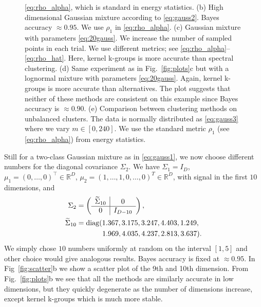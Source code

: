 \documentclass[10pt,journal,compsoc]{IEEEtran}
\DeclareMathOperator{\diag}{diag}
\begin{document}
\begin{figure}
{\eqref{eq:rho_alpha}, which is standard in energy statistics.
(b)
High dimensional Gaussian mixture according to \eqref{eq:gauss2}.
Bayes accuracy $\approx 0.95$. We use $\rho_1$ in \eqref{eq:rho_alpha}.
(c)
Gaussian mixture with parameters \eqref{eq:20gauss}. We increase
the number of sampled points in each trial. We use different
metrics; see \eqref{eq:rho_alpha}--\eqref{eq:rho_hat}. 
Here, kernel k-groups is more accurate than spectral clustering.
(d)
Same experiment as in Fig.~\ref{fig:plots}c but with a 
lognormal mixture with parameters \eqref{eq:20gauss}.
Again, kernel k-groups is more accurate than alternatives.
The plot suggests that neither of these methods are
consistent on this example since Bayes accuracy is $\approx 0.90$.
(e)
Comparison between clustering methods
on unbalanced clusters. The data is normally 
distributed as \eqref{eq:gauss3} where
we vary $m \in [0, 240]$. We use the standard metric $\rho_1$ (see
\eqref{eq:rho_alpha}) from energy statistics.
}
\end{figure}

Still for a two-class Gaussian mixture as in \eqref{eq:gauss1}, we now choose
different numbers for the  diagonal covariance $\Sigma_2$.
We have $\Sigma_1=I_D$, $\mu_1=(0,\dotsc,0)^\top \in \mathbb{R}^D$,
$\mu_2=(1,\dotsc,1,0,\dotsc,0)^T \in \mathbb{R}^D$, 
with signal in the first $10$ dimensions, and
\begin{equation}
\label{eq:gauss2}
\begin{split}
\Sigma_2 &= \left( \begin{array}{c|c}
\widetilde{\Sigma}_{10} & 0 \\ \hline 
0 & I_{D-10} \end{array}\right), \\
\widetilde{\Sigma}_{10} &= \diag(1.367,  3.175,  3.247,  4.403,  1.249,\\
&\hspace{3.6em}1.969, 4.035,   4.237,  2.813,  3.637).
\end{split}
\end{equation}
We simply chose $10$ numbers uniformly at random on the interval
$[1,5]$ and other choice would give analogous results.
Bayes  accuracy is fixed at $\approx 0.95$. In Fig~\ref{fig:scatter}b
we show a scatter plot of the 9th and 10th dimension.
From Fig.~\ref{fig:plots}b we see that 
all the methods are similarly accurate in low dimensions, but they quickly
degenerate as the number of dimensions increase, except 
kernel k-groups which is much more stable.
\end{document}
